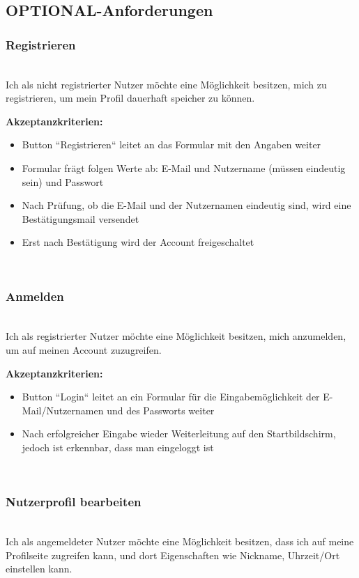 \documentclass[conference]{IEEEtran}
\begin{document}
	\subsection{OPTIONAL-Anforderungen}
	\subsubsection{Registrieren}
	\ \\
	Ich als nicht registrierter Nutzer möchte eine Möglichkeit besitzen, mich zu registrieren, um mein Profil dauerhaft speicher zu können.
	
	\textbf{Akzeptanzkriterien:}
	\begin{itemize}
		\item Button ``Registrieren`` leitet an das Formular mit den Angaben weiter
		\item Formular frägt folgen Werte ab: E-Mail und Nutzername (müssen eindeutig sein) und Passwort
		\item Nach Prüfung, ob die E-Mail und der Nutzernamen eindeutig sind, wird eine Bestätigungsmail versendet
		\item Erst nach Bestätigung wird der Account freigeschaltet
	\end{itemize}
	
	\ \\
	\subsubsection{Anmelden}
	\ \\
	Ich als registrierter Nutzer möchte eine Möglichkeit besitzen, mich anzumelden, um auf meinen Account zuzugreifen.
	
	\textbf{Akzeptanzkriterien:}
	\begin{itemize}
		\item Button ``Login`` leitet an ein Formular für die Eingabemöglichkeit der E-Mail/Nutzernamen und des Passworts weiter
		\item Nach erfolgreicher Eingabe wieder Weiterleitung auf den Startbildschirm, jedoch ist erkennbar, dass man eingeloggt ist
	\end{itemize}
	
	\ \\
	\subsubsection{Nutzerprofil bearbeiten}
	\ \\
	Ich als angemeldeter Nutzer möchte eine Möglichkeit besitzen, dass ich auf meine Profilseite zugreifen kann, und dort Eigenschaften wie Nickname, Uhrzeit/Ort einstellen kann.
	
\end{document}
